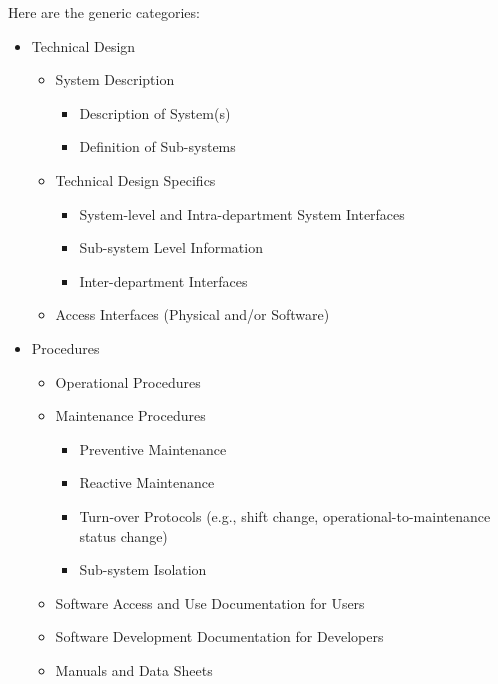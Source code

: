 Here are the generic categories:

\begin{small}

\begin{itemize}
  \item Technical Design
	\begin{itemize}

	  \item System Description
		\begin{itemize}
		  \item Description of System(s)
		  \item Definition of Sub-systems
		\end{itemize}

	  \item Technical Design Specifics
		\begin{itemize}
		  \item System-level and Intra-department System Interfaces
		  \item Sub-system Level Information
		  \item Inter-department Interfaces
		\end{itemize}
	  \item Access Interfaces (Physical and/or Software)
	\end{itemize}


  \item Procedures
	\begin{itemize}

	  \item Operational Procedures

	  \item Maintenance Procedures
		\begin{itemize}
		  \item Preventive Maintenance
		  \item Reactive Maintenance
		  \item Turn-over Protocols (e.g., shift change, operational-to-maintenance status change)
		  \item Sub-system Isolation
		\end{itemize}

	  \item Software Access and Use Documentation for Users

	  \item Software Development Documentation for Developers

	  \item Manuals and Data Sheets
	\end{itemize}



\end{itemize}
\end{small}
